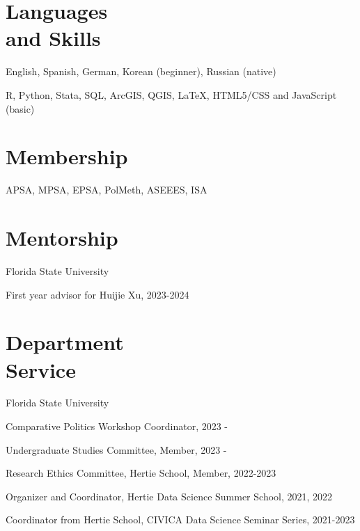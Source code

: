 \documentclass[margin,line,10.95pt]{res}
\newenvironment{list1}{
  \begin{list}{\ding{113}}{%
      \setlength{\itemsep}{0in}
      \setlength{\parsep}{0in} \setlength{\parskip}{0in}
      \setlength{\topsep}{0in} \setlength{\partopsep}{0in}
      \setlength{\leftmargin}{0.17in}}}{\end{list}}
\begin{document}
\begin{resume}
\section{\sc Languages \\ and Skills}
English, Spanish, German, Korean (beginner), Russian (native)
\vspace*{-4.5mm}

R, Python, Stata, SQL, ArcGIS, QGIS, \LaTeX , HTML5/CSS and JavaScript (basic) 
\vspace*{-2.5mm}

\section{\sc Membership}

APSA, MPSA, EPSA, PolMeth, ASEEES, ISA

\section{\sc Mentorship}

{Florida State University}\\
\vspace*{-.1in}
\begin{list1}
\item[] First year advisor for Huijie Xu, 2023-2024
\end{list1}



\section{\sc Department \\ Service}

{Florida State University}\\
\vspace*{-.1in}
\begin{list1}
\item[] Comparative Politics Workshop Coordinator, 2023 -
\item[] Undergraduate Studies Committee, Member, 2023 -
\end{list1}

Research Ethics Committee, Hertie School, Member, 2022-2023
\vspace*{-4.5mm}

Organizer and Coordinator, Hertie Data Science Summer School, 2021, 2022
\vspace*{-4.5mm}

Coordinator from Hertie School, CIVICA Data Science Seminar Series, 2021-2023
\vspace*{-3.5mm}


\end{resume}
\end{document}

